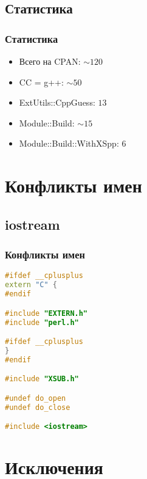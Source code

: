 \documentclass[pdflatex,hyperref={unicode=true}]{beamer}
\begin{document}
\subsection{Статистика}
\begin{frame}[t]
    \frametitle{Статистика}
    \begin{itemize}
        \item Всего на CPAN: $\sim120$
        \item CC = g++: $\sim50$
        \item ExtUtils::CppGuess: $13$
        \item Module::Build: $\sim15$
        \item Module::Build::WithXSpp: $6$
    \end{itemize}
\end{frame}

\section{Конфликты имен}

\subsection{iostream}
\begin{frame}[t,fragile]
    \frametitle{Конфликты имен}
    \begin{lstlisting}[language=C++,style=PerlXS]
#ifdef __cplusplus
extern "C" {
#endif

#include "EXTERN.h"
#include "perl.h"

#ifdef __cplusplus
}
#endif

#include "XSUB.h"

#undef do_open
#undef do_close

#include <iostream>
    \end{lstlisting}
\end{frame}

\section{Исключения}
\end{document}

